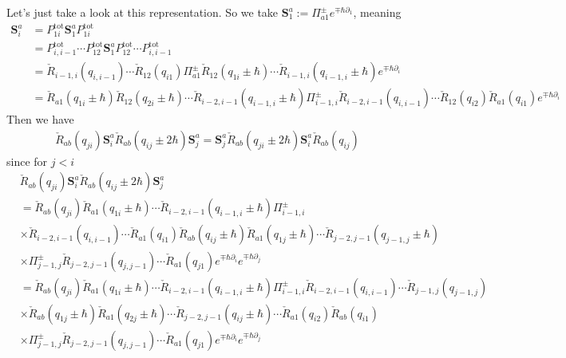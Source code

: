 \documentclass[11pt]{report}
\theoremstyle{definition}
\theoremstyle{remark}
\theoremstyle{remark}
\begin{document}
Let's just take a look at this representation. So we take $\mathbf{S}_1^a := \Pi_{a1}^\pm e^{\mp\hbar\partial_1}$, meaning
\begin{align*}
\mathbf{S}_i^a
&= P_{1i}^\text{tot} \mathbf{S}_1^a P_{1i}^\text{tot} \\
&= P_{i,i-1}^\text{tot} \cdots P_{12}^\text{tot} \mathbf{S}_1^a P_{12}^\text{tot} \cdots P_{i,i-1}^\text{tot} \\
&= \check R_{i-1,i}(q_{i,i-1}) \cdots \check R_{12}(q_{i1}) \Pi_{a1}^\pm \check R_{12}(q_{1i}\pm\hbar) \cdots \check R_{i-1,i}(q_{i-1,i}\pm\hbar) e^{\mp\hbar\partial_i} \\
&= \check R_{a1}(q_{1i}\pm\hbar) \check R_{12}(q_{2i}\pm\hbar) \cdots \check R_{i-2,i-1}(q_{i-1,i}\pm\hbar) \Pi_{i-1,i}^\pm \check R_{i-2,i-1}(q_{i,i-1}) \cdots \check R_{12}(q_{i2}) \check R_{a1}(q_{i1}) e^{\mp\hbar\partial_i}
\end{align*}
Then we have
\begin{align*}
\check R_{ab}(q_{ji}) \mathbf{S}_i^a \check R_{ab}(q_{ij}\pm 2\hbar) \mathbf{S}_j^a = \mathbf{S}_j^a \check R_{ab}(q_{ji}\pm 2\hbar) \mathbf{S}_i^a \check R_{ab}(q_{ij})
\end{align*}
since for $j<i$
\begin{align*}
&\check R_{ab}(q_{ji}) \mathbf{S}_i^a \check R_{ab}(q_{ij}\pm 2\hbar) \mathbf{S}_j^a \\
&= \check R_{ab}(q_{ji}) \check R_{a1}(q_{1i}\pm\hbar) \cdots \check R_{i-2,i-1}(q_{i-1,i}\pm\hbar) \Pi_{i-1,i}^\pm \\
&\times \check R_{i-2,i-1}(q_{i,i-1}) \cdots \check R_{a1}(q_{i1}) \check R_{ab}(q_{ij}\pm \hbar) \check R_{a1}(q_{1j}\pm\hbar) \cdots \check R_{j-2,j-1}(q_{j-1,j}\pm\hbar) \\
&\times \Pi_{j-1,j}^\pm \check R_{j-2,j-1}(q_{j,j-1}) \cdots \check R_{a1}(q_{j1}) e^{\mp\hbar\partial_i} e^{\mp\hbar\partial_j} \\
&= \check R_{ab}(q_{ji}) \check R_{a1}(q_{1i}\pm\hbar) \cdots \check R_{i-2,i-1}(q_{i-1,i}\pm\hbar) \Pi_{i-1,i}^\pm \check R_{i-2,i-1}(q_{i,i-1}) \cdots \check R_{j-1,j}(q_{j-1,j}) \\
&\times \check R_{ab}(q_{1j}\pm\hbar) \check R_{a1}(q_{2j}\pm\hbar) \cdots \check R_{j-2,j-1}(q_{ij}\pm \hbar) \cdots \check R_{a1}(q_{i2}) \check R_{ab}(q_{i1}) \\
&\times \Pi_{j-1,j}^\pm \check R_{j-2,j-1}(q_{j,j-1}) \cdots \check R_{a1}(q_{j1}) e^{\mp\hbar\partial_i} e^{\mp\hbar\partial_j}
\end{align*}
\end{document}

